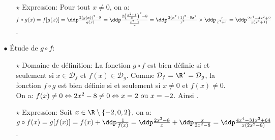 \begin{correction}
\begin{enumerate}
\begin{itemize}
\begin{itemize}
\item[$\star$] Expression: Pour tout $x\not= 0$, on a:
 $f\circ g(x)=f\lbrack g(x)\rbrack=\ddp\frac{2(g(x))^2-8}{g(x)}=\ddp\frac{2\left( \frac{x^2+1}{x}\right)^2-8}{\frac{x^2+1}{x}}=\ddp\frac{2(x^2+1)^2-8x^2}{x^2}\times \ddp\frac{x}{x^2+1}=\ddp\frac{2x^4-4x^2+2}{x(x^2+1)}$.
\end{itemize}
\item[$\bullet$] \'Etude de $g\circ f$: \begin{itemize}
\item[$\star$] Domaine de d\'efinition: La fonction $g\circ f$ est bien d\'efinie si et seulement si $x\in\mathcal{D}_f$ et $f(x)\in\mathcal{D}_g$. Comme $\mathcal{D}_f=\R^{\star}=\mathcal{D}_g$, la fonction $f\circ g$ est bien d\'efinie si et seulement si $x\not= 0$ et $f(x)\not= 0$. On a: $f(x)\not= 0\Leftrightarrow 2x^2-8\not= 0\Leftrightarrow x=2\ \hbox{ou}\ x=-2$. Ainsi .
\item[$\star$] Expression: Soit $x\in\R\setminus\lbrace  -2,0,2\rbrace$, on a: 
$g\circ f(x)=g\lbrack f(x)\rbrack=f(x)+\ddp\frac{1}{f(x)}=\ddp\frac{2x^2-8}{x}+\ddp\frac{x}{2x^2-8}=\ddp\frac{ 4x^4-31x^2+64 }{x(2x^2-8)}$.
\end{itemize}
\end{itemize}
\end{enumerate}
\end{correction}
